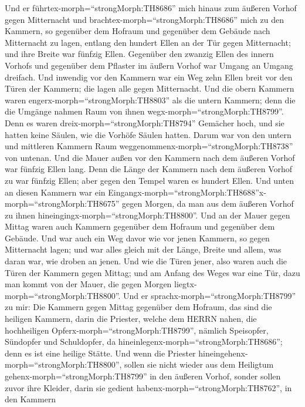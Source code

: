  Und er führtex-morph=``strongMorph:TH8686'' mich hinaus zum
äußeren Vorhof gegen Mitternacht und
brachtex-morph=``strongMorph:TH8686'' mich zu den Kammern, so gegenüber
dem Hofraum und gegenüber dem Gebäude nach Mitternacht zu lagen,
 entlang den hundert Ellen an der Tür gegen Mitternacht; und
ihre Breite war fünfzig Ellen.  Gegenüber den zwanzig Ellen
des innern Vorhofs und gegenüber dem Pflaster im äußern Vorhof war
Umgang an Umgang dreifach.  Und inwendig vor den Kammern war
ein Weg zehn Ellen breit vor den Türen der Kammern; die lagen alle gegen
Mitternacht.  Und die obern Kammern waren
engerx-morph=``strongMorph:TH8803'' als die untern Kammern; denn die die
Umgänge nahmen Raum von ihnen wegx-morph=``strongMorph:TH8799''.
 Denn es waren dreix-morph=``strongMorph:TH8794'' Gemächer
hoch, und sie hatten keine Säulen, wie die Vorhöfe Säulen hatten. Darum
war von den untern und mittleren Kammern Raum
weggenommenx-morph=``strongMorph:TH8738'' von untenan.  Und
die Mauer außen vor den Kammern nach dem äußeren Vorhof war fünfzig
Ellen lang.  Denn die Länge der Kammern nach dem äußeren
Vorhof zu war fünfzig Ellen; aber gegen den Tempel waren es hundert
Ellen.  Und unten an diesen Kammern war ein
Eingangx-morph=``strongMorph:TH8688''x-morph=``strongMorph:TH8675''
gegen Morgen, da man aus dem äußeren Vorhof zu ihnen
hineingingx-morph=``strongMorph:TH8800''.  Und an der Mauer
gegen Mittag waren auch Kammern gegenüber dem Hofraum und gegenüber dem
Gebäude.  Und war auch ein Weg davor wie vor jenen Kammern,
so gegen Mitternacht lagen; und war alles gleich mit der Länge, Breite
und allem, was daran war, wie droben an jenen.  Und wie die
Türen jener, also waren auch die Türen der Kammern gegen Mittag; und am
Anfang des Weges war eine Tür, dazu man kommt von der Mauer, die gegen
Morgen liegtx-morph=``strongMorph:TH8800''.  Und er
sprachx-morph=``strongMorph:TH8799'' zu mir: Die Kammern gegen Mittag
gegenüber dem Hofraum, das sind die heiligen Kammern, darin die
Priester, welche dem HERRN nahen, die hochheiligen
Opferx-morph=``strongMorph:TH8799'', nämlich Speisopfer, Sündopfer und
Schuldopfer, da hineinlegenx-morph=``strongMorph:TH8686''; denn es ist
eine heilige Stätte.  Und wenn die Priester
hineingehenx-morph=``strongMorph:TH8800'', sollen sie nicht wieder aus
dem Heiligtum gehenx-morph=``strongMorph:TH8799'' in den äußeren Vorhof,
sonder sollen zuvor ihre Kleider, darin sie gedient
habenx-morph=``strongMorph:TH8762'', in den Kammern
